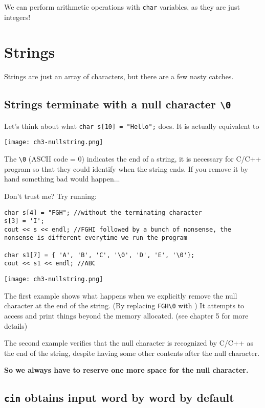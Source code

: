 We can perform arithmetic operations with \texttt{char} variables, as they are just integers! 

\section{Strings}

Strings are just an array of characters, but there are a few nasty catches.

\subsection*{Strings terminate with a null character \texttt{\textbackslash 0}}

Let's think about what \texttt{char s[10] = "Hello";} does. It is actually equivalent to 

\texttt{[image: ch3-nullstring.png]}

The \texttt{\textbackslash 0} (ASCII code = 0) indicates the end of a string, it is necessary for C/C++ program so that they could identify when the string ends. If you remove it by hand something bad would happen...

Don't trust me? Try running:

\begin{lstlisting}
char s[4] = "FGH"; //without the terminating character
s[3] = 'I';
cout << s << endl; //FGHI followed by a bunch of nonsense, the nonsense is different everytime we run the program

char s1[7] = { 'A', 'B', 'C', '\0', 'D', 'E', '\0'};
cout << s1 << endl; //ABC
\end{lstlisting}

\texttt{[image: ch3-nullstring.png]}

The first example shows what happens when we explicitly remove the null character at the end of the string. (By replacing \texttt{FGH\textbackslash 0} with ) It attempts to access and print things beyond the memory allocated. (see chapter 5 for more details)

The second example verifies that the null character is recognized by C/C++ as the end of the string, despite having some other contents after the null character.

\textbf{So we always have to reserve one more space for the null character.}

\subsection*{\texttt{cin} obtains input word by word by default}


